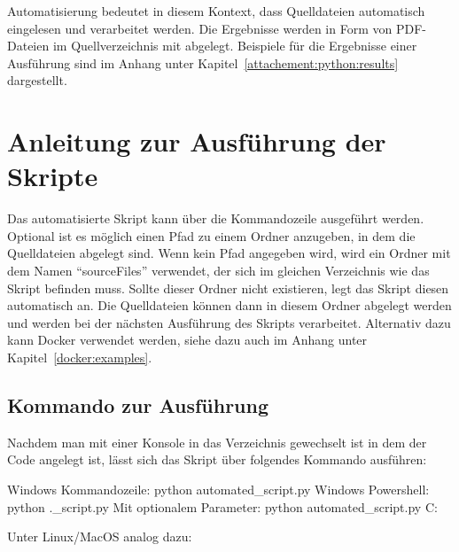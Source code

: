 Automatisierung bedeutet in diesem Kontext, dass Quelldateien automatisch eingelesen und verarbeitet werden.
Die Ergebnisse werden in Form von PDF-Dateien im Quellverzeichnis mit abgelegt.
Beispiele für die Ergebnisse einer Ausführung sind im Anhang unter Kapitel~\ref{attachement:python:results} dargestellt.

\section{Anleitung zur Ausführung der Skripte}
Das automatisierte Skript kann über die Kommandozeile ausgeführt werden.
Optional ist es möglich einen Pfad zu einem Ordner anzugeben, in dem die Quelldateien abgelegt sind.
Wenn kein Pfad angegeben wird, wird ein Ordner mit dem Namen \enquote{sourceFiles} verwendet, der sich im gleichen Verzeichnis wie das Skript befinden muss.
Sollte dieser Ordner nicht existieren, legt das Skript diesen automatisch an.
Die Quelldateien können dann in diesem Ordner abgelegt werden und werden bei der nächsten Ausführung des Skripts verarbeitet.
Alternativ dazu kann Docker verwendet werden, siehe dazu auch im Anhang unter Kapitel~\ref{docker:examples}.

\subsection{Kommando zur Ausführung}
Nachdem man mit einer Konsole in das Verzeichnis gewechselt ist in dem der Code angelegt ist, lässt sich das Skript über folgendes Kommando ausführen:

{}{}

\begin{ExecuteCommandWindows}
Windows Kommandozeile:
	python automated_script.py
Windows Powershell:
	python .\automated\_script.py
Mit optionalem Parameter:
	python automated_script.py C:\Temp\sourcefolder
\end{ExecuteCommandWindows}

Unter Linux/MacOS analog dazu:

